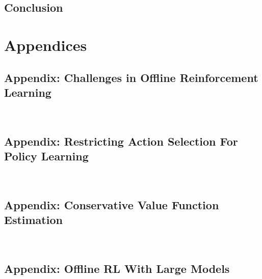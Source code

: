\documentclass[letterpaper,12pt, oneside]{lib/ucthesis}
\def\ssp{\def\baselinestretch{1.0}\large\normalsize}
\newcommand{\changelocaltocdepth}[1]{%
  \addtocontents{toc}{\protect\setcounter{tocdepth}{#1}}%
  \setcounter{tocdepth}{#1}%
}
\begin{document}
\begin{dissertationText}
% 	

% 	
	
\chapter{Conclusion}
	

\ssp

% 

	

\part{Appendices}
\changelocaltocdepth{0}

\appendix

\chapter{Appendix: Challenges in Offline Reinforcement Learning}~\label{sec:appendix-challenges}
	

\chapter{Appendix: Restricting Action Selection For Policy Learning}~\label{sec:appendix-bear}
	

\chapter{Appendix: Conservative Value Function Estimation}~\label{sec:appendix-cql}


\chapter{Appendix: Offline RL With Large Models}~\label{sec:appendix-large}



\end{dissertationText}
\end{document}
